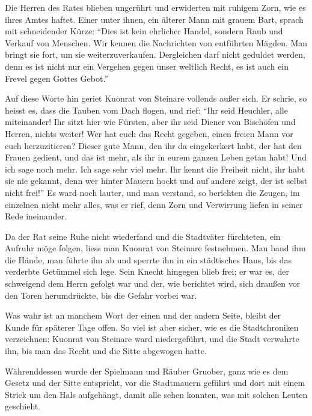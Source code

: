Die Herren des Rates blieben ungerührt und erwiderten mit ruhigem Zorn, wie es ihres Amtes haftet. Einer unter ihnen, ein älterer Mann mit grauem Bart, sprach mit schneidender Kürze: \enquote{Dies ist kein ehrlicher Handel, sondern Raub und Verkauf von Menschen. Wir kennen die Nachrichten von entführten Mägden. Man bringt sie fort, um sie weiterzuverkaufen. Dergleichen darf nicht geduldet werden, denn es ist nicht nur ein Vergehen gegen unser weltlich Recht, es ist auch ein Frevel gegen Gottes Gebot.}

Auf diese Worte hin geriet \gls{Kuonrat von Steinare} vollends außer sich. Er schrie, so heisst es, dass die Tauben vom Dach flogen, und rief: \enquote{Ihr seid Heuchler, alle miteinander! Ihr sitzt hier wie Fürsten, aber ihr seid Diener von Bischöfen und Herren, nichts weiter! Wer hat euch das Recht gegeben, einen freien Mann vor euch herzuzitieren? Dieser gute Mann, den ihr da eingekerkert habt, der hat den Frauen gedient, und das ist mehr, als ihr in eurem ganzen Leben getan habt! Und ich sage noch mehr. Ich sage sehr viel mehr. Ihr kennt die \gls{Freiheit} nicht, ihr habt sie nie gekannt, denn wer hinter Mauern hockt und auf andere zeigt, der ist selbst nicht frei!} Es ward noch lauter, und man verstand, so berichten die Zeugen, im einzelnen nicht mehr alles, was er rief, denn Zorn und Verwirrung liefen in seiner Rede ineinander.

Da der Rat seine Ruhe nicht wiederfand und die Stadtväter fürchteten, ein Aufruhr möge folgen, liess man \gls{Kuonrat von Steinare} festnehmen. Man band ihm die Hände, man führte ihn ab und sperrte ihn in ein städtisches Haus, bis das verderbte Getümmel sich lege. Sein \gls{Knecht} hingegen blieb frei; er war es, der schweigend dem Herrn gefolgt war und der, wie berichtet wird, sich draußen vor den Toren herumdrückte, bis die Gefahr vorbei war.

Was wahr ist an manchem Wort der einen und der andern Seite, bleibt der Kunde für späterer Tage offen. So viel ist aber sicher, wie es die Stadtchroniken verzeichnen: \gls{Kuonrat von Steinare} ward niedergeführt, und die Stadt verwahrte ihn, bis man das Recht und die Sitte abgewogen hatte.

Währenddessen wurde der Spielmann und Räuber \gls{Gruober}, ganz wie es dem Gesetz und der Sitte entspricht, vor die Stadtmauern geführt und dort mit einem Strick um den Hals aufgehängt, damit alle sehen konnten, was mit solchen Leuten geschieht.
